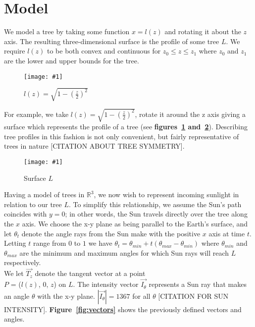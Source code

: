 \documentclass[10pt,twocolumn]{article}
\newlength{\imgwidth}
\newcommand\scalegraphics[1]{%
    \settowidth{\imgwidth}{\texttt{[image: \#1]}}%
    \setlength{\imgwidth}{\minof{\imgwidth}{\columnwidth}}%
    \texttt{[image: \#1]}%
}
\begin{document}
\section{Model}

We model a tree by taking some function $x = l(z)$ and rotating it
about the $z$ axis. The resulting three-dimensional surface is the
profile of some tree $L$. We require $l(z)$ to be both convex and
continuous for $z_0 \le z \le z_1$ where $z_0$ and $z_1$ are the lower
and upper bounds for the tree. \\

\begin{figure}[h!]
  \caption{$l(z)=\sqrt{1-(\frac{z}{2})^2}$}
  \centering
  \scalegraphics{img/lz.png}
  \label{fig:l(z)}
\end{figure}

For example, we take $l(z) = \sqrt{1-(\frac{z}{2})^2}$, rotate it around
the z axis giving a surface which represents the profile of a tree
(see {\bf figures~\ref{fig:l(z)} and~\ref{fig:L}}). Describing tree
profiles in this fashion is not only convenient, but fairly
representative of trees in nature [CITATION ABOUT TREE SYMMETRY]. \\

\begin{figure}[h!]
  \centering
  \scalegraphics{img/L.png}
  \caption{Surface $L$}
  \label{fig:L}
\end{figure}

Having a model of trees in $\mathbb{R}^3$, we now wish to represent
incoming sunlight in relation to our tree $L$. To simplify this
relationship, we assume the Sun's path coincides with $y=0$; in other
words, the Sun travels directly over the tree along the $x$ axis. We
choose the x-y plane as being parallel to the Earth's surface, and let
$\theta_t$ denote the angle rays from the Sun make with the positive
$x$ axis at time $t$. Letting $t$ range from $0$ to $1$ we have
$\theta_t = \theta_{min} + t(\theta_{max} - \theta_{min})$ where
$\theta_{min}$ and $\theta_{max}$ are the minimum and maximum angles
for which Sun rays will reach $L$ respectively. \\

We let $\vec{T_z}$ denote the tangent vector at a point \\ $P$ =
($l(z)$, 0, $z$) on $L$. The intensity vector $\vec{I_\theta}$
represents a Sun ray that makes an angle $\theta$ with the x-y
plane. $|\vec{I_\theta}| = 1367$ for all $\theta$ [CITATION FOR SUN
  INTENSITY]. {\bf Figure~\ref{fig:vectors}} shows the previously defined
vectors and angles.
\end{document}
